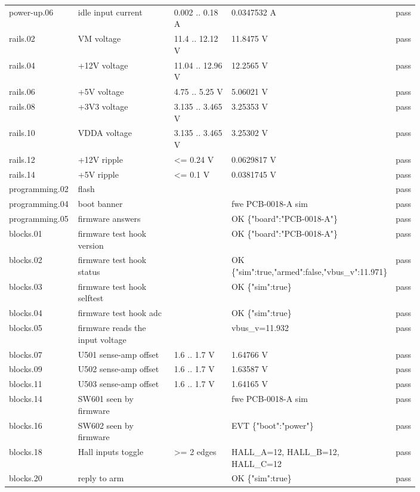 \documentclass[11pt]{article}
\begin{document}
{\begin{longtable}{p{0.17\linewidth}p{0.31\linewidth}p{0.18\linewidth}p{0.14\linewidth}l}
\mbox{power-up.06} & idle input current & 0.002 .. 0.18 A & 0.0347532 A & pass \\
\mbox{rails.02} & VM voltage & 11.4 .. 12.12 V & 11.8475 V & pass \\
\mbox{rails.04} & +12V voltage & 11.04 .. 12.96 V & 12.2565 V & pass \\
\mbox{rails.06} & +5V voltage & 4.75 .. 5.25 V & 5.06021 V & pass \\
\mbox{rails.08} & +3V3 voltage & 3.135 .. 3.465 V & 3.25353 V & pass \\
\mbox{rails.10} & VDDA voltage & 3.135 .. 3.465 V & 3.25302 V & pass \\
\mbox{rails.12} & +12V ripple & <= 0.24 V & 0.0629817 V & pass \\
\mbox{rails.14} & +5V ripple & <= 0.1 V & 0.0381745 V & pass \\
\mbox{programming.02} & flash &  &   & pass \\
\mbox{programming.04} & boot banner &  & fwe PCB-0018-A sim  & pass \\
\mbox{programming.05} & firmware answers &  & OK \{"board":"PCB-0018-A"\}  & pass \\
\mbox{blocks.01} & firmware test hook version &  & OK \{"board":"PCB-0018-A"\}  & pass \\
\mbox{blocks.02} & firmware test hook status &  & OK \{"sim":true,"armed":false,"vbus\_v":11.971\}  & pass \\
\mbox{blocks.03} & firmware test hook selftest &  & OK \{"sim":true\}  & pass \\
\mbox{blocks.04} & firmware test hook adc &  & OK \{"sim":true\}  & pass \\
\mbox{blocks.05} & firmware reads the input voltage &  & vbus\_v=11.932  & pass \\
\mbox{blocks.07} & U501 sense-amp offset & 1.6 .. 1.7 V & 1.64766 V & pass \\
\mbox{blocks.09} & U502 sense-amp offset & 1.6 .. 1.7 V & 1.63587 V & pass \\
\mbox{blocks.11} & U503 sense-amp offset & 1.6 .. 1.7 V & 1.64165 V & pass \\
\mbox{blocks.14} & SW601 seen by firmware &  & fwe PCB-0018-A sim  & pass \\
\mbox{blocks.16} & SW602 seen by firmware &  & EVT \{"boot":"power"\}  & pass \\
\mbox{blocks.18} & Hall inputs toggle & >= 2 edges & HALL\_A=12, HALL\_B=12, HALL\_C=12  & pass \\
\mbox{blocks.20} & reply to arm &  & OK \{"sim":true\}  & pass \\

\end{longtable}}
\end{document}
